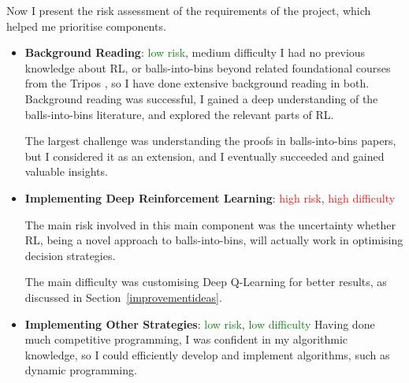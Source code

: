 Now I present the risk assessment of the requirements of the project, which helped me prioritise components.

\begin{itemize}

    \item \textbf{Background Reading}: \textcolor{green}{low risk}, \textcolor{YellowOrange}{medium difficulty}
    I had no previous knowledge about RL, or balls-into-bins beyond related foundational courses from the Tripos , so I have done extensive background reading in both. Background reading was successful, I gained a deep understanding of the balls-into-bins literature, and explored the relevant parts of RL.
    
    The largest challenge was understanding the proofs in balls-into-bins papers, but I considered it as an extension, and I eventually succeeded and gained valuable insights.
    
    \item \textbf{Implementing Deep Reinforcement Learning}: \textcolor{red}{high risk}, \textcolor{red}{high difficulty}
    
    The main risk involved in this main component was the uncertainty whether RL, being a novel approach to balls-into-bins, will actually work in optimising decision strategies. 
    
    The main difficulty was customising Deep Q-Learning for better results, as discussed in Section~\ref{improvementideas}.
    
    \item \textbf{Implementing Other Strategies}: \textcolor{green}{low risk}, \textcolor{green}{low difficulty}
    Having done much competitive programming, I was confident in my algorithmic knowledge, so I could efficiently develop and implement algorithms, such as dynamic programming.
    

\end{itemize}
